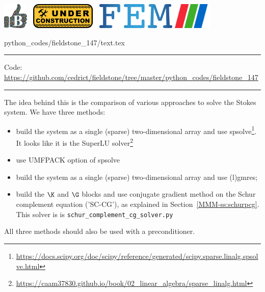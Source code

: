 \noindent
\includegraphics[height=1.25cm]{images/pictograms/benchmark}
\includegraphics[height=1.25cm]{images/pictograms/under_construction}
\includegraphics[height=1.25cm]{images/pictograms/FEM}
\includegraphics[height=1.25cm]{images/pictograms/paraview}



\begin{flushright} {\tiny {\color{gray} python\_codes/fieldstone\_147/text.tex}} \end{flushright}

%

\par\noindent\rule{\textwidth}{0.4pt}

\begin{center}
\inpython
{\small Code: \url{https://github.com/cedrict/fieldstone/tree/master/python_codes/fieldstone_147}}
\end{center}

\par\noindent\rule{\textwidth}{0.4pt}


The idea behind this \stone is the comparison of various approaches to solve the 
Stokes system.
We have three methods:
\begin{itemize}
\item build the system as a single (sparse) two-dimensional array and use 
spsolve\footnote{\url{https://docs.scipy.org/doc/scipy/reference/generated/scipy.sparse.linalg.spsolve.html}}. It looks like it is the SuperLU solver\footnote{\url{https://caam37830.github.io/book/02_linear_algebra/sparse_linalg.html}} 
\item use UMFPACK option of spsolve
\item build the system as a single (sparse) two-dimensional array and use (l)gmres;
\item build the $\K$ and $\G$ blocks and use conjugate gradient method on 
the Schur complement equation ('SC-CG'), as explained in Section~\ref{MMM-ss:schurpcg}.
This solver is is {\tt schur\_complement\_cg\_solver.py}
\end{itemize}
All three methods should also be used with a preconditioner.

